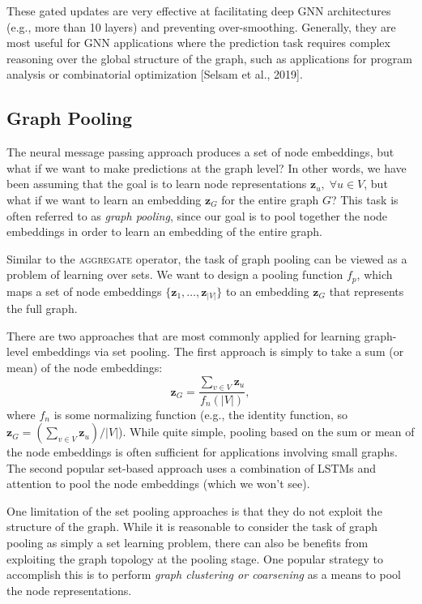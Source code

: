 \documentclass[10pt]{book}
\let\defaultmarginpar\marginpar
\renewcommand\marginpar[2][]{\defaultmarginpar{\itshape\color{gray}#2}}
\begin{document}
These gated updates are very effective at facilitating deep GNN architectures (e.g., more than 10 layers) and preventing over-smoothing. Generally, they are most useful for GNN applications where the prediction task requires complex reasoning over the global structure of the graph, such as applications for program analysis or combinatorial optimization [Selsam et al., 2019].

\subsection{Graph Pooling}

The neural message passing approach produces a set of node embeddings, but what if we want to make predictions at the graph level? In other words, we have been assuming that the goal is to learn node representations $\mathbf z_u, \; \forall u \in V$, but what if we want to learn an embedding $\mathbf z_G$ for the entire graph $G$? This task is often referred to as \emph{graph pooling}\marginpar{graph pooling}, since our goal is to pool together the node embeddings in order to learn an embedding of the entire graph.

Similar to the \textsc{aggregate} operator, the task of graph pooling can be viewed as a problem of learning over sets. We want to design a pooling function $f_p$, which maps a set of node embeddings $\{\mathbf z_1, \ldots, \mathbf z_{|V|} \}$ to an embedding $\mathbf z_G$ that represents the full graph.

There are two approaches that are most commonly applied for learning graph-level embeddings via set pooling. The first approach is simply to take a sum (or mean) of the node embeddings:
\begin{equation}
    \mathbf z_G = \frac{\sum_{v \in V} \mathbf z_u}{f_n(|V|)},
\end{equation}
where $f_n$ is some normalizing function (e.g., the identity function, so $\mathbf z_G = (\sum_{v \in V} \mathbf z_u)/|V|$). While quite simple, pooling based on the sum or mean of the node embeddings is often sufficient for applications involving small graphs. The second popular set-based approach uses a combination of LSTMs and attention to pool the node embeddings (which we won't see).

One limitation of the set pooling approaches is that they do not exploit the structure of the graph. While it is reasonable to consider the task of graph pooling as simply a set learning problem, there can also be benefits from exploiting the graph topology at the pooling stage. One popular strategy to accomplish this is to perform \emph{graph clustering or coarsening} as a means to pool the node representations.
\end{document}
